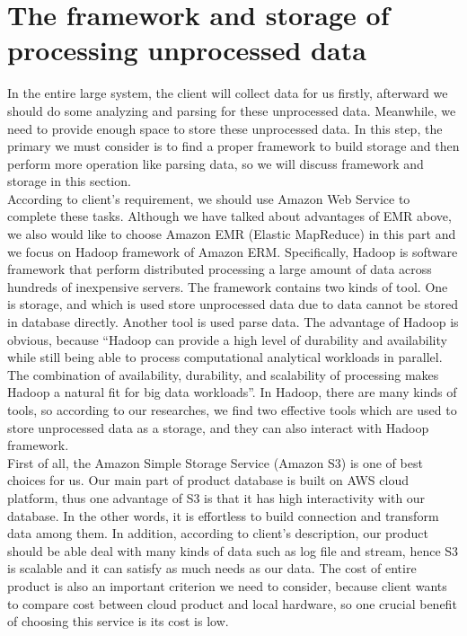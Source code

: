        \section{The framework and storage of processing unprocessed data}
        In the entire large system, the client will collect data for us firstly, afterward we should do some analyzing and parsing for these unprocessed data. Meanwhile, we need to provide enough space to store these unprocessed data. In this step, the primary we must consider is to find a proper framework to build storage and then perform more operation like parsing data, so we will discuss framework and storage in this section.\\

        \noindent According to client’s requirement, we should use Amazon Web Service to complete these tasks. Although we have talked about advantages of EMR above, we also would like to choose Amazon EMR (Elastic MapReduce) in this part and we focus on Hadoop framework of Amazon ERM. Specifically, Hadoop is software framework that perform distributed processing a large amount of data across hundreds of inexpensive servers\cite{Z1}. The framework contains two kinds of tool. One is storage, and which is used store unprocessed data due to data cannot be stored in database directly. Another tool is used parse data. The advantage of Hadoop is obvious, because “Hadoop can provide a high level of durability and availability while still being able to process computational analytical workloads in parallel. The combination of availability, durability, and scalability of processing makes Hadoop a natural fit for big data workloads”\cite{Z2}. In Hadoop, there are many kinds of tools, so according to our researches, we find two effective tools which are used to store unprocessed data as a storage, and they can also interact with Hadoop framework.\\ 

        \noindent First of all, the Amazon Simple Storage Service (Amazon S3) is one of best choices for us. Our main part of product database is built on AWS cloud platform, thus one advantage of S3 is that it has high interactivity with our database. In the other words, it is effortless to build connection and transform data among them. In addition, according to client’s description, our product should be able deal with many kinds of data such as log file and stream, hence S3 is scalable and it can satisfy as much needs as our data. The cost of entire product is also an important criterion we need to consider, because client wants to compare cost between cloud product and local hardware, so one crucial benefit of choosing this service is its cost is low.\\


